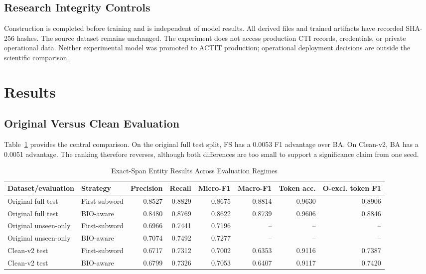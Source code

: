\documentclass[conference]{IEEEtran}
\begin{document}
\subsection{Research Integrity Controls}
Construction is completed before training and is independent of model results. All derived files and trained artifacts have recorded SHA-256 hashes. The source dataset remains unchanged. The experiment does not access production CTI records, credentials, or private operational data. Neither experimental model was promoted to ACTIT production; operational deployment decisions are outside the scientific comparison.

\section{Results}
\subsection{Original Versus Clean Evaluation}
Table~\ref{tab:main-results} provides the central comparison. On the original full test split, FS has a 0.0053 F1 advantage over BA. On Clean-v2, BA has a 0.0051 advantage. The ranking therefore reverses, although both differences are too small to support a significance claim from one seed.

\begin{table}[t]
\caption{Exact-Span Entity Results Across Evaluation Regimes}
\label{tab:main-results}
\centering
\small
\begin{tabular}{llrrrrrr}
\toprule
Dataset/evaluation & Strategy & Precision & Recall & Micro-F1 & Macro-F1 & Token acc. & O-excl. token F1 \\
\midrule
Original full test & First-subword & 0.8527 & 0.8829 & 0.8675 & 0.8814 & 0.9630 & 0.8906 \\
Original full test & BIO-aware & 0.8480 & 0.8769 & 0.8622 & 0.8739 & 0.9606 & 0.8846 \\
Original unseen-only & First-subword & 0.6966 & 0.7441 & 0.7196 & -- & -- & -- \\
Original unseen-only & BIO-aware & 0.7074 & 0.7492 & 0.7277 & -- & -- & -- \\
Clean-v2 test & First-subword & 0.6717 & 0.7312 & 0.7002 & 0.6353 & 0.9116 & 0.7387 \\
Clean-v2 test & BIO-aware & 0.6799 & 0.7326 & 0.7053 & 0.6407 & 0.9117 & 0.7420 \\
\bottomrule
\end{tabular}
\end{table}
\end{document}
